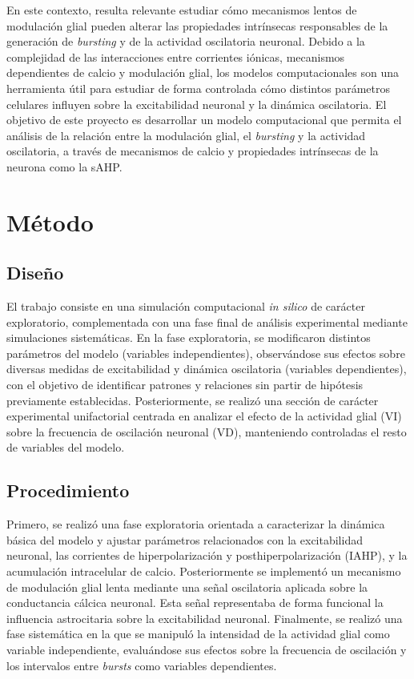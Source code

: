 \documentclass[12pt,a4paper]{report}
\begin{document}
En este contexto, resulta relevante estudiar cómo mecanismos lentos de modulación glial pueden alterar las propiedades intrínsecas responsables de la generación de \textit{bursting} y de la actividad oscilatoria neuronal. Debido a la complejidad de las interacciones entre corrientes iónicas, mecanismos dependientes de calcio y modulación glial, los modelos computacionales son una herramienta útil para estudiar de forma controlada cómo distintos parámetros celulares influyen sobre la excitabilidad neuronal y la dinámica oscilatoria.
El objetivo de este proyecto es desarrollar un modelo computacional que permita el análisis de la relación entre la modulación glial, el \textit{bursting} y la actividad oscilatoria, a través de mecanismos de calcio y propiedades intrínsecas de la neurona como la sAHP.

\section{Método}
\subsection{Diseño}
El trabajo consiste en una simulación computacional \textit{in silico} de carácter exploratorio, complementada con una fase final de análisis experimental mediante simulaciones sistemáticas. En la fase exploratoria, se modificaron distintos parámetros del modelo (variables independientes), observándose sus efectos sobre diversas medidas de excitabilidad y dinámica oscilatoria (variables dependientes), con el objetivo de identificar patrones y relaciones sin partir de hipótesis previamente establecidas.
Posteriormente, se realizó una sección de carácter experimental unifactorial centrada en analizar el efecto de la actividad glial (VI) sobre la frecuencia de oscilación neuronal (VD), manteniendo controladas el resto de variables del modelo.

\subsection{Procedimiento}
Primero, se realizó una fase exploratoria orientada a caracterizar la dinámica básica del modelo y ajustar parámetros relacionados con la excitabilidad neuronal, las corrientes de hiperpolarización y posthiperpolarización (IAHP), y la acumulación intracelular de calcio. Posteriormente se implementó un mecanismo de modulación glial lenta mediante una señal oscilatoria aplicada sobre la conductancia cálcica neuronal. Esta señal representaba de forma funcional la influencia astrocitaria sobre la excitabilidad neuronal. Finalmente, se realizó una fase sistemática en la que se manipuló la intensidad de la actividad glial como variable independiente, evaluándose sus efectos sobre la frecuencia de oscilación y los intervalos entre \textit{bursts} como variables dependientes.
\end{document}
